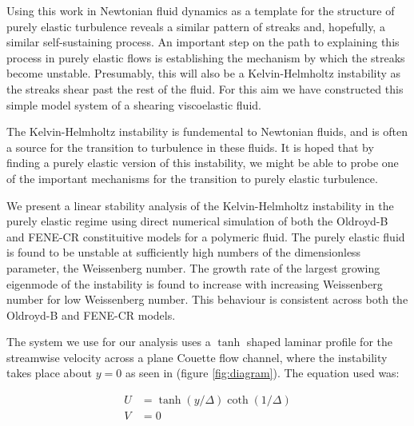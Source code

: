 \documentclass{jfm}
\begin{document}
Using this work in Newtonian fluid dynamics as a template for the structure of purely elastic turbulence reveals a similar pattern of streaks and, hopefully, a similar self-sustaining process. An important step on the path to explaining this process in purely elastic flows is establishing the mechanism by which the streaks become unstable. Presumably, this will also be a Kelvin-Helmholtz instability as the streaks shear past the rest of the fluid. For this aim we have constructed this simple model system of a shearing viscoelastic fluid.

The Kelvin-Helmholtz instability is fundemental to Newtonian fluids, and is often a source for the transition to turbulence in these fluids. It is hoped that by finding a purely elastic version of this instability, we might be able to probe one of the important mechanisms for the transition to purely elastic turbulence.

We present a linear stability analysis of the Kelvin-Helmholtz instability in the purely elastic regime using direct numerical simulation of both the Oldroyd-B and FENE-CR constituitive models for a polymeric fluid. The purely elastic fluid is found to be unstable at sufficiently high numbers of the dimensionless parameter, the Weissenberg number. The growth rate of the largest growing eigenmode of the instability is found to increase with increasing Weissenberg number for low Weissenberg number. This behaviour is consistent across both the Oldroyd-B and FENE-CR models.

The system we use for our analysis uses a $\tanh$ shaped laminar profile for the streamwise velocity across a plane Couette flow channel, where the instability takes place about $y=0$ as seen in (figure \ref{fig:diagram}). The equation used was:

\begin{align}
    U &= \tanh \left( y/\Delta \right) \coth \left( 1/\Delta \right) \\
    V &= 0 
    \label{eq:KH_laminar_profile}
\end{align}
\end{document}
